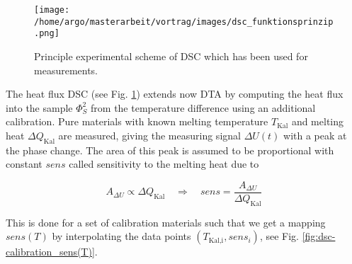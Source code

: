 \documentclass{scrartcl}[12pt, halfparskip]
\begin{document}
\begin{figure}[H]
	\centering
	\texttt{[image: /home/argo/masterarbeit/vortrag/images/dsc\_funktionsprinzip.png]}
	\caption{Principle experimental scheme of DSC which has been used for measurements.}
	\label{fig:heat_flux_DSC}
\end{figure}

The heat flux DSC (see Fig. \ref{fig:heat_flux_DSC}) extends now DTA by computing the heat flux into the sample $\Phi_S^2$ from the temperature difference using an additional calibration. 
Pure materials with known melting temperature $T_{\text{Kal}}$ and melting heat $\Delta Q_{\text{Kal}}$ are measured, giving the measuring signal $\Delta U(t)$ with a peak at the phase change. 
The area of this peak is assumed to be proportional with constant $sens$ called sensitivity to the melting heat due to

\begin{equation}
	A_{\Delta U} \propto \Delta Q_{\text{Kal}} \quad \Rightarrow \quad sens = \frac{A_{\Delta U}}{\Delta Q_{\text{Kal}}}
\end{equation} 

This is done for a set of calibration materials such that we get a mapping $sens(T)$ by interpolating the data points $(T_{\text{Kal,i}}, sens_i)$, see Fig. \ref{fig:dsc-calibration_sens(T)}.
\end{document}
